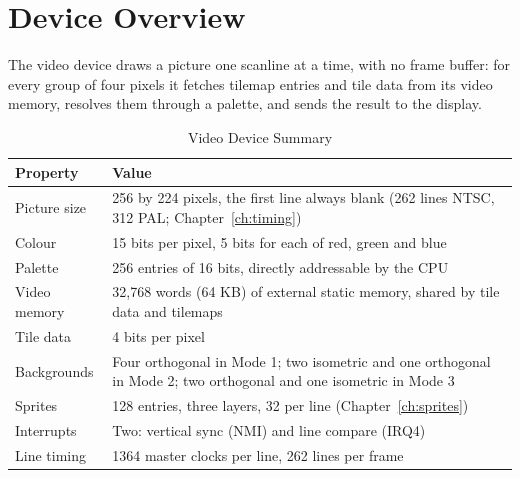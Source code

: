 \section{Device Overview}

The video device draws a picture one scanline at a time, with no frame buffer: for every group of four pixels it
fetches tilemap entries and tile data from its video memory, resolves them through a palette, and sends the result to
the display.

\begin{table}[H]
	\centering
	\begin{tabular}{lp{9cm}}
		\toprule
		\textbf{Property} & \textbf{Value}                                                                                                    \\
		\midrule
		Picture size      & 256 by 224 pixels, the first line always blank (262 lines NTSC, 312 PAL; Chapter~\ref{ch:timing})                 \\
		Colour            & 15 bits per pixel, 5 bits for each of red, green and blue                                                         \\
		Palette           & 256 entries of 16 bits, directly addressable by the CPU                                                           \\
		Video memory      & 32,768 words (64 KB) of external static memory, shared by tile data and tilemaps                                  \\
		Tile data         & 4 bits per pixel                                                                                                  \\
		Backgrounds       & Four orthogonal in Mode 1; two isometric and one orthogonal in Mode 2; two orthogonal and one isometric in Mode 3 \\
		Sprites           & 128 entries, three layers, 32 per line (Chapter~\ref{ch:sprites})                                                 \\
		Interrupts        & Two: vertical sync (NMI) and line compare (IRQ4)                                                                  \\
		Line timing       & 1364 master clocks per line, 262 lines per frame                                                                  \\
		\bottomrule
	\end{tabular}
	\caption{Video Device Summary}
	\label{tab:device-summary}
\end{table}

